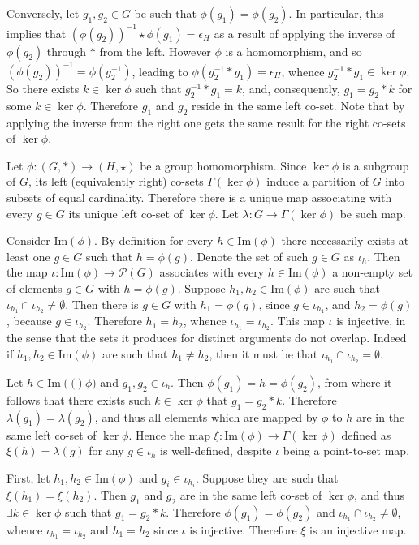 \documentclass[a4paper]{article}
\newcommand{\brac}[1]{{\left({#1}\right)}}
\newcommand{\im}[1]{\ensuremath{\text{Im}\brac{ #1 }}}
\begin{document}
Conversely, let $g_1, g_2\in G$ be such that $\phi(g_1)=\phi(g_2)$. In particular, this implies that $\brac{\phi(g_2)}^{-1}\star \phi(g_1)=\epsilon_H$ as a result of applying the inverse of $\phi(g_2)$ through $\ast$ from the left. However $\phi$ is a homomorphism, and so $\brac{\phi(g_2)}^{-1}=\phi(g_2^{-1})$, leading to $\phi(g_2^{-1}\ast g_1)=\epsilon_H$, whence $g_2^{-1}\ast g_1\in \ker{\phi}$. So there exists $k\in \ker{\phi}$ such that $g_2^{-1}\ast g_1=k$, and, consequently, $g_1=g_2\ast k$ for some $k\in \ker{\phi}$. Therefore $g_1$ and $g_2$ reside in the same left co-set. Note that by applying the inverse from the right one gets the same result for the right co-sets of $\ker{\phi}$.

Let $\phi:\brac{G, \ast}\to \brac{H, \star}$ be a group homomorphism. Since $\ker{\phi}$ is a subgroup of $G$, its left (equivalently right) co-sets $\Gamma(\ker{\phi})$ induce a partition of $G$ into subsets of equal cardinality. Therefore there is a unique map associating with every $g\in G$ its unique left co-set of $\ker{\phi}$. Let $\lambda:G\to \Gamma(\ker{\phi})$ be such map.

Consider $\im{\phi}$. By definition for every $h\in \im{\phi}$ there necessarily exists at least one $g\in G$ such that $h=\phi(g)$. Denote the set of such $g\in G$ as $\iota_h$. Then the map $\iota:\im{\phi}\to \mathcal{P}\brac{G}$ associates with every $h\in \im{\phi}$ a non-empty set of elements $g\in G$ with $h=\phi(g)$.
Suppose $h_1, h_2\in \im{\phi}$ are such that $\iota_{h_1}\cap \iota_{h_2}\neq \emptyset$. Then there is $g\in G$ with $h_1=\phi(g)$, since $g\in \iota_{h_1}$, and $h_2=\phi(g)$, because $g\in \iota_{h_2}$. Therefore $h_1=h_2$, whence $\iota_{h_1}=\iota_{h_2}$.
This map $\iota$ is injective, in the sense that the sets it produces for distinct arguments do not overlap. Indeed if $h_1, h_2\in \im{\phi}$ are such that $h_1\neq h_2$, then it must be that $\iota_{h_1}\cap \iota_{h_2}=\emptyset$.

Let $h\in \im(\phi)$ and $g_1, g_2\in \iota_h$. Then $\phi(g_1)=h=\phi(g_2)$, from where it follows that there exists such $k\in \ker{\phi}$ that $g_1=g_2\ast k$. Therefore $\lambda(g_1)=\lambda(g_2)$, and thus all elements which are mapped by $\phi$ to $h$ are in the same left co-set of $\ker{\phi}$. Hence the map $\xi:\im{\phi}\to \Gamma(\ker{\phi})$ defined as $\xi(h) = \lambda(g)$ for any $g\in \iota_h$ is well-defined, despite $\iota$ being a point-to-set map.

First, let $h_1, h_2\in \im{\phi}$ and $g_i\in \iota_{h_i}$. Suppose they are such that $\xi(h_1)=\xi(h_2)$. Then $g_1$ and $g_2$ are in the same left co-set of $\ker{\phi}$, and thus $\exists{k\in \ker{\phi}}$ such that $g_1=g_2\ast k$. Therefore $\phi(g_1)=\phi(g_2)$ and $\iota_{h_1}\cap \iota_{h_2}\neq \emptyset$, whence $\iota_{h_1} = \iota_{h_2}$ and $h_1=h_2$ since $\iota$ is injective. Therefore $\xi$ is an injective map.
\end{document}
